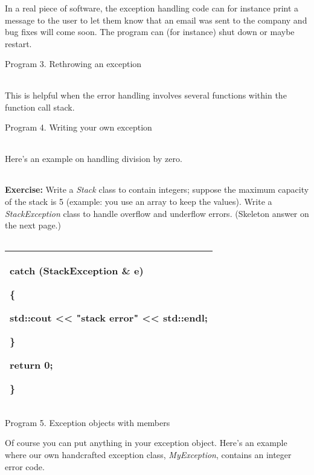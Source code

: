 \documentclass[
]{article}
\begin{document}
In a real piece of software, the exception handling code can for
instance print a message to the user to let them know that an email was
sent to the company and bug fixes will come soon. The program can (for
instance) shut down or maybe restart.

Program 3. Rethrowing an exception

\begin{longtable}[]{@{}@{}}
\toprule
\endhead
\bottomrule
\end{longtable}

This is helpful when the error handling involves several functions
within the function call stack.

Program 4. Writing your own exception

\begin{longtable}[]{@{}@{}}
\toprule
\endhead
\bottomrule
\end{longtable}

Here's an example on handling division by zero.

\begin{longtable}[]{@{}@{}}
\toprule
\endhead
\bottomrule
\end{longtable}

\textbf{Exercise:} Write a \emph{Stack} class to contain integers;
suppose the maximum capacity of the stack is 5 (example: you use an
array to keep the values). Write a \emph{StackException} class to handle
overflow and underflow errors. (Skeleton answer on the next page.)

\begin{longtable}[]{@{}@{}}
\toprule
\endhead
\bottomrule
\end{longtable}

\begin{longtable}[]{@{}l@{}}
\toprule
\endhead
\begin{minipage}[t]{0.97\columnwidth}\raggedright
catch (\textbf{StackException \& e})

\{

std::cout \textless\textless{} "stack error" \textless\textless{}
std::endl;

\}

return 0;

\}\strut
\end{minipage}\tabularnewline
\bottomrule
\end{longtable}

Program 5. Exception objects with members

Of course you can put anything in your exception object. Here's an
example where our own handcrafted exception class, \emph{MyException},
contains an integer error code.
\end{document}
